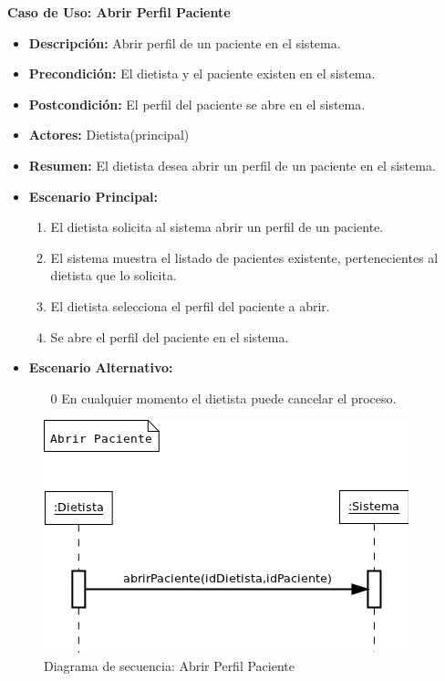 \textbf{Caso de Uso: Abrir Perfil Paciente}
\begin{itemize}
\item \textbf{Descripción:} Abrir perfil de un paciente en el sistema.
\item \textbf{Precondición:} El dietista y el paciente existen en el sistema.
\item \textbf{Postcondición:} El perfil del paciente se abre en el sistema.
\item \textbf{Actores:} Dietista(principal)
\item \textbf{Resumen:} El dietista desea abrir un perfil de un paciente en el sistema.
\item \textbf{Escenario Principal:}
\begin{enumerate}
\item El dietista solicita al sistema abrir un perfil de un paciente.
\item El sistema muestra el listado de pacientes existente, pertenecientes al dietista que lo solicita.
\item El dietista selecciona el perfil del paciente a abrir.
\item Se abre el perfil del paciente en el sistema.
\end{enumerate}
\item \textbf{Escenario Alternativo:}
\begin{enumerate}
\item[0] En cualquier momento el dietista puede cancelar el proceso.
\end{enumerate}
\end{itemize}
\begin{figure}[H]
  \label{ds_abrirpaciente}
  \begin{center}
    \includegraphics[scale=0.7]{../img/DS_AbrirPaciente.png}
  \end{center}
  \caption{Diagrama de secuencia: Abrir Perfil Paciente}
\end{figure}
